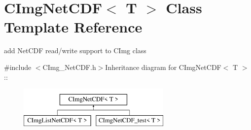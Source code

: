 \hypertarget{classCImgNetCDF}{
\section{CImgNetCDF$<$ T $>$ Class Template Reference}
\label{classCImgNetCDF}
}


add NetCDF read/write support to CImg class  


{\ttfamily \#include $<$CImg\_\-NetCDF.h$>$}Inheritance diagram for CImgNetCDF$<$ T $>$::\begin{figure}[H]
\begin{center}
\leavevmode
\includegraphics[height=2cm]{classCImgNetCDF}
\end{center}
\end{figure}
